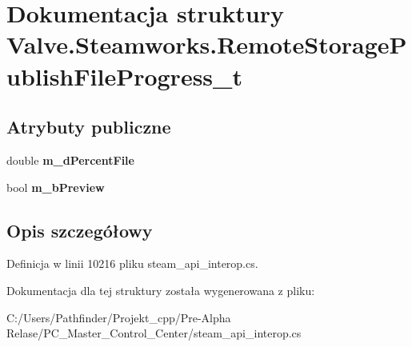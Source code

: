 \hypertarget{struct_valve_1_1_steamworks_1_1_remote_storage_publish_file_progress__t}{}\section{Dokumentacja struktury Valve.\+Steamworks.\+Remote\+Storage\+Publish\+File\+Progress\+\_\+t}
\label{struct_valve_1_1_steamworks_1_1_remote_storage_publish_file_progress__t}
\subsection*{Atrybuty publiczne}
\begin{DoxyCompactItemize}
\item 
\mbox{\label{struct_valve_1_1_steamworks_1_1_remote_storage_publish_file_progress__t_a89f1669ee6b0764e44f917d9d11a8732}} 
double {\bfseries m\+\_\+d\+Percent\+File}
\item 
\mbox{\label{struct_valve_1_1_steamworks_1_1_remote_storage_publish_file_progress__t_a46c3f2162e61d12fbec1e03c3eed3003}} 
bool {\bfseries m\+\_\+b\+Preview}
\end{DoxyCompactItemize}


\subsection{Opis szczegółowy}


Definicja w linii 10216 pliku steam\+\_\+api\+\_\+interop.\+cs.



Dokumentacja dla tej struktury została wygenerowana z pliku\+:\begin{DoxyCompactItemize}
\item 
C\+:/\+Users/\+Pathfinder/\+Projekt\+\_\+cpp/\+Pre-\/\+Alpha Relase/\+P\+C\+\_\+\+Master\+\_\+\+Control\+\_\+\+Center/steam\+\_\+api\+\_\+interop.\+cs\end{DoxyCompactItemize}
